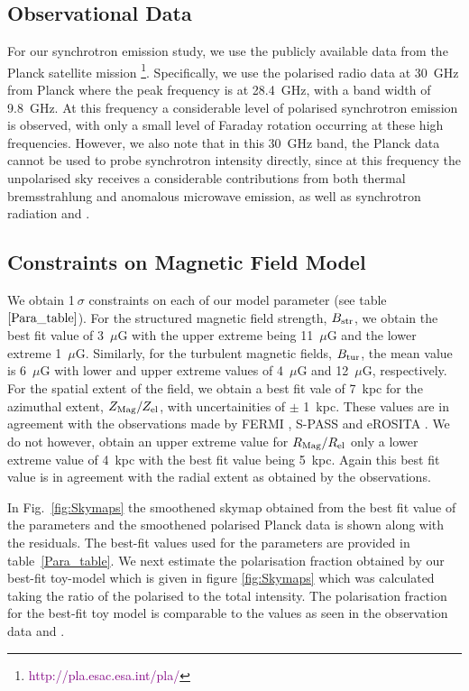 \documentclass[usenatbib]{mnras}
\begin{document}
\subsection{Observational Data}
For our synchrotron emission study, we use the publicly available data from the Planck satellite mission \footnote{\textcolor{purple}{http://pla.esac.esa.int/pla/}}. Specifically, we use the polarised radio data at 30~GHz from Planck where the peak frequency is at 28.4~GHz, with a band width of 9.8~GHz. At this frequency a considerable level of polarised synchrotron emission is observed, with only a small level of Faraday rotation occurring at these high frequencies. However, we also note that in this 30~GHz band, the Planck data cannot be used to probe synchrotron intensity directly, since at this frequency the unpolarised sky receives a considerable contributions from both thermal bremsstrahlung and anomalous microwave emission, as well as synchrotron radiation \cite{Planck_XIX} and \cite{Planck_XLII}. 

\subsection{Constraints on Magnetic Field Model}
\label{Results}
We obtain 1$~\sigma$ constraints on each of our model parameter (see table~$\ref{Para_table}$). For the structured magnetic field strength, $B_{\rm str}$, we obtain the best fit value of 3~$\mu$G with the upper extreme being 11~$\mu$G and the lower extreme 1~$\mu$G. Similarly, for the turbulent magnetic fields, $B_{\rm tur}$, the mean value is 6~$\mu$G with lower and upper extreme values of 4~$\mu$G and 12~$\mu$G, respectively. For the spatial extent of the field, we obtain a best fit vale of 7~kpc for the azimuthal extent, $Z_{\rm Mag}/Z_{\rm el}$, with uncertainities of $\pm$ 1~kpc. These values are in agreement with the observations made by FERMI \cite{Su_2010}, S-PASS \cite{Carretti_2013} and eROSITA \cite{eROSITA}. We do not however, obtain an upper extreme value for $R_{\rm Mag}/R_{\rm el}$ only a lower extreme value of 4~kpc with the best fit value being 5~kpc. Again this best fit value is in agreement with the radial extent as obtained by the observations.

In Fig.~\ref{fig:Skymaps} the smoothened skymap obtained from the best fit value of the parameters and the smoothened polarised Planck data is shown along with the residuals. The best-fit values used for the parameters are provided in table~\ref{Para_table}. 
We next estimate the polarisation fraction obtained by our best-fit toy-model which is given in figure \ref{fig:Skymaps} which was calculated taking the ratio of the polarised to the total intensity. The polarisation fraction for the best-fit toy model is comparable to the values as seen in the observation data \cite{Carretti_2013} and \cite{WMAP_Page}.
\end{document}
